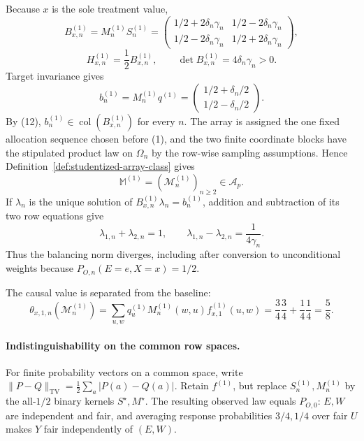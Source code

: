 Because \(x\) is the sole treatment value,
\[
B^{(1)}_{x,n}=M^{(1)}_nS^{(1)}_n
=\begin{pmatrix}
1/2+2\delta_n\gamma_n&1/2-2\delta_n\gamma_n\\
1/2-2\delta_n\gamma_n&1/2+2\delta_n\gamma_n
\end{pmatrix},
\tag{11}
\]
\[
H^{(1)}_{x,n}=\frac12B^{(1)}_{x,n},
\qquad
\det B^{(1)}_{x,n}=4\delta_n\gamma_n>0.
\tag{12}
\]
Target invariance gives
\[
b^{(1)}_n=M^{(1)}_nq^{(1)}
=\begin{pmatrix}1/2+\delta_n/2\\1/2-\delta_n/2\end{pmatrix}.
\tag{13}
\]
By (12), \(b^{(1)}_n\in\operatorname{col}(B^{(1)}_{x,n})\) for every \(n\). The array is assigned the one fixed allocation sequence chosen before (1), and the two finite coordinate blocks have the stipulated product law on \(\Omega_n\) by the row-wise sampling assumptions. Hence Definition~\ref{def:studentized-array-class} gives
\[
\mathbb M^{(1)}=(\mathcal M^{(1)}_n)_{n\ge2}\in\mathcal A_p.
\tag{14}
\]
If \(\lambda_n\) is the unique solution of \(B^{(1)}_{x,n}\lambda_n=b^{(1)}_n\), addition and subtraction of its two row equations give
\[
\lambda_{1,n}+\lambda_{2,n}=1,
\qquad
\lambda_{1,n}-\lambda_{2,n}=\frac1{4\gamma_n}.
\tag{15}
\]
Thus the balancing norm diverges, including after conversion to unconditional weights because \(P_{O,n}(E=e,X=x)=1/2\).

The causal value is separated from the baseline:
\[
\theta_{x,1,n}(\mathcal M^{(1)}_n)
=\sum_{u,w}q^{(1)}_uM^{(1)}_n(w,u)f^{(1)}_{x,1}(u,w)
=\frac34\frac34+\frac14\frac14
=\frac58.
\tag{16}
\]

\paragraph{Indistinguishability on the common row spaces.}
For finite probability vectors on a common space, write \(\lVert P-Q\rVert_{\mathrm{TV}}=\frac12\sum_a|P(a)-Q(a)|\). Retain \(f^{(1)}\), but replace \(S^{(1)}_n,M^{(1)}_n\) by the all-\(1/2\) binary kernels \(S^{\star},M^{\star}\). The resulting observed law equals \(P_{O,0}\): \(E,W\) are independent and fair, and averaging response probabilities \(3/4,1/4\) over fair \(U\) makes \(Y\) fair independently of \((E,W)\).

